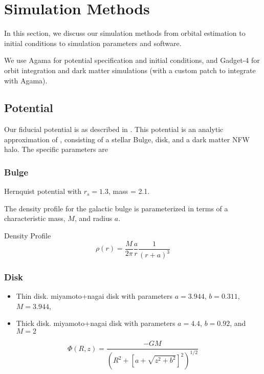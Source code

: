 \section{Simulation Methods}\label{simulation-methods}

In this section, we discuss our simulation methods from orbital
estimation to initial conditions to simulation parameters and software.

We use Agama \citep{vasiliev} for potential specification and initial
conditions, and Gadget-4 \citep{springle2021} for orbit integration and
dark matter simulations (with a custom patch to integrate with Agama).

\subsection{Potential}\label{potential}

Our fiducial potential is as described in \citet{EP2020}. This potential
is an analytic approximation of \citet{McMillan2011}, consisting of a
stellar Bulge, disk, and a dark matter NFW halo. The specific parameters
are

\subsubsection{Bulge}\label{bulge}

Hernquist potential with \(r_s=1.3\), mass = 2.1.

The \citet{hernquist1990} density profile for the galactic bulge is
parameterized in terms of a characteristic mass, \(M\), and radius
\(a\).

Density Profile \[
\rho(r) = \frac{M}{2\pi} \frac{a}{r} \frac{1}{(r+a)^3}
\]

\subsubsection{Disk}\label{disk}

\begin{itemize}
\tightlist
\item
  Thin disk. miyamoto+nagai disk with parameters \(a=3.944\),
  \(b=0.311\), \(M=3.944\),
\item
  Thick disk. miyamoto+nagai disk with parameters \(a=4.4\), \(b=0.92\),
  and \(M=2\)
\end{itemize}

\[
\Phi(R, z) = \frac{-GM}{\left(R^2 + \left[a + \sqrt{z^2 + b^2}\right]^{2}\right)^{1/2}}
\]

